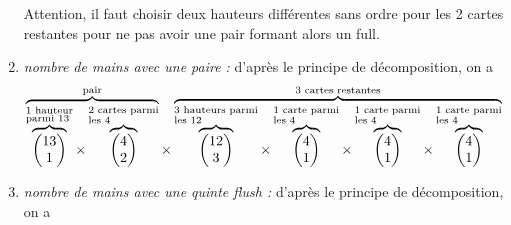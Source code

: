 \documentclass{book}
\begin{document}
\begin{Exercice}[Poker]
\begin{Correction}
\begin{enumerate}
$$$$
Attention, il faut choisir deux hauteurs différentes sans ordre pour les 2 cartes restantes pour ne pas avoir une pair formant alors un full.
\item \textit{nombre de mains avec une paire :} d'après le principe de décomposition,  on a  
$$\overbrace{
\overbrace{\begin{pmatrix}13\\1\end{pmatrix}}^
{\begin{subarray}{l}\text{1 hauteur}\\
    \text{parmi 13}\end{subarray}}
\times    \overbrace{\begin{pmatrix}4\\2\end{pmatrix}}^{\begin{subarray}{l}\text{2 cartes parmi}\\
    \text{les 4}\end{subarray}}}^{\text{pair}}
\times \overbrace{   \overbrace{\begin{pmatrix}12\\3\end{pmatrix}}^{\begin{subarray}{l}\text{3 hauteurs parmi}\\
    \text{les 12}\end{subarray}}
\times    \overbrace{\begin{pmatrix}4\\1\end{pmatrix}}^{\begin{subarray}{l}\text{1 carte parmi}\\
    \text{les 4}\end{subarray}}
\times    \overbrace{\begin{pmatrix}4\\1\end{pmatrix}}^{\begin{subarray}{l}\text{1 carte parmi}\\
    \text{les 4}\end{subarray}}
 \times    \overbrace{\begin{pmatrix}4\\1\end{pmatrix}}^{\begin{subarray}{l}\text{1 carte parmi}\\
    \text{les 4}\end{subarray}}   
    }^{\text{3 cartes restantes}}
$$
\item \textit{nombre de mains avec une quinte flush :} d'après le principe de décomposition,  on a  

\end{enumerate}
\end{Correction}
\end{Exercice}
\end{document}
